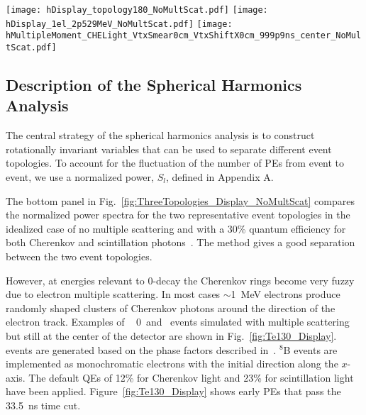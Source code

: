 \begin{figure*}[h]
  \centering
  \texttt{[image: hDisplay\_topology180\_NoMultScat.pdf]}
  \texttt{[image: hDisplay\_1el\_2p529MeV\_NoMultScat.pdf]}
  \texttt{[image: hMultipleMoment\_CHELight\_VtxSmear0cm\_VtxShiftX0cm\_999p9ns\_center\_NoMultScat.pdf]}
  \caption{\emph{Top panels:} Idealized event displays, with multiple
scattering turned off and at the center of the detector, of:
(\emph{top left}) a signal event with two 1.26~MeV back-to-back
electrons; and (\emph{top right })a \B-neutrino background event with
single 2.53~MeV electron. A 30\% QE is assumed for both Cherenkov
photons (triangles) and scintillation photons (dots).  
\emph{Bottom panel:} The normalized power spectrum $S_l$ for the
Cherenkov photons only, calculated event-by-event for the two
above topologies The height of the rectangular boxes correspond to a 
63\% confidence level $(\pm 1 ~\sigma)$.}
  \label{fig:ThreeTopologies_Display_NoMultScat}
\end{figure*}


\subsection{Description of the Spherical Harmonics Analysis}

The central strategy of the spherical harmonics analysis is to
construct rotationally invariant variables that can be used to
separate different event topologies. To account for the fluctuation of
the number of PEs from event to event, we use a normalized power,
$S_l$, defined in Appendix A.

The bottom panel in Fig.~\ref{fig:ThreeTopologies_Display_NoMultScat}
compares the normalized power spectra for the two representative event
topologies in the idealized case of no multiple scattering and with a 30\%
quantum efficiency for both Cherenkov and scintillation
photons~\cite{QE}. The method gives a good separation between the
two event topologies.

However, at energies relevant to 0\nbb-decay the Cherenkov rings
become very fuzzy due to electron multiple scattering. In most cases
$\sim$1~MeV electrons produce randomly shaped clusters of Cherenkov
photons around the direction of the electron track.  Examples of \Te~
0\nbb~and \B~events simulated with multiple scattering but still at
the center of the detector are shown in Fig.~\ref{fig:Te130_Display}.
\Te~ events are generated based on the phase factors described
in~\cite{Jenni}.  $^{8}$B events are implemented as
monochromatic electrons with the initial direction along the
$x$-axis. The default QEs of 12\% for Cherenkov light and 23\% for
scintillation light have been  applied. Figure~\ref{fig:Te130_Display} shows
early PEs that pass the 33.5~ns time cut. 

